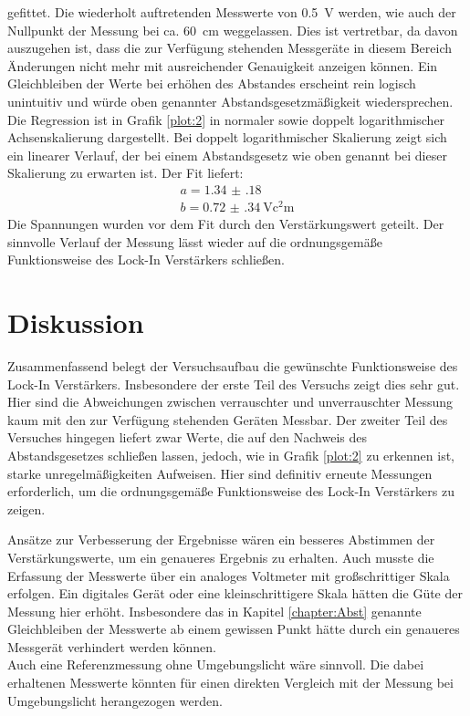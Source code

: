 gefittet. Die wiederholt auftretenden Messwerte von \SI{0.5}{\volt} werden, wie auch der Nullpunkt der Messung bei ca. \SI{60}{\centi\metre}
weggelassen. Dies ist vertretbar, da davon auszugehen ist, dass die zur Verfügung stehenden Messgeräte in diesem Bereich Änderungen nicht
mehr mit ausreichender Genauigkeit anzeigen können. Ein Gleichbleiben der Werte bei erhöhen des Abstandes
erscheint rein logisch unintuitiv und würde oben genannter Abstandsgesetzmäßigkeit wiedersprechen. Die Regression ist
in Grafik \ref{plot:2} in normaler sowie doppelt logarithmischer Achsenskalierung dargestellt.
Bei doppelt logarithmischer Skalierung zeigt sich ein linearer Verlauf, der bei einem Abstandsgesetz wie oben genannt
bei dieser Skalierung zu erwarten ist. Der Fit liefert:
\begin{equation*}
  \begin{split}
    a = \num{1.34(18)}\\
    b = \SI{0.72(34)}{\volt\square\centi\metre}
  \end{split}
\end{equation*}
Die Spannungen wurden vor dem Fit durch den Verstärkungswert geteilt. Der sinnvolle Verlauf der Messung
lässt wieder auf die ordnungsgemäße Funktionsweise des Lock-In Verstärkers schließen.
\section{Diskussion}
Zusammenfassend belegt der Versuchsaufbau die gewünschte Funktionsweise des Lock-In Verstärkers. Insbesondere der erste Teil
des Versuchs zeigt dies sehr gut. Hier sind die Abweichungen zwischen verrauschter und unverrauschter Messung kaum mit
den zur Verfügung stehenden Geräten Messbar. Der zweiter Teil des Versuches hingegen liefert zwar
Werte, die auf den Nachweis des Abstandsgesetzes schließen lassen, jedoch, wie in Grafik \ref{plot:2} zu erkennen ist,
starke unregelmäßigkeiten Aufweisen. Hier sind definitiv erneute Messungen erforderlich, um
die ordnungsgemäße Funktionsweise des Lock-In Verstärkers zu zeigen.

Ansätze zur Verbesserung der Ergebnisse wären ein besseres Abstimmen der Verstärkungswerte, um ein
genaueres Ergebnis zu erhalten. Auch musste die Erfassung der Messwerte über ein analoges
Voltmeter mit großschrittiger Skala erfolgen. Ein digitales Gerät oder eine kleinschrittigere
Skala hätten die Güte der Messung hier erhöht. Insbesondere das in Kapitel \ref{chapter:Abst}
genannte Gleichbleiben der Messwerte ab einem gewissen Punkt hätte durch ein genaueres
Messgerät verhindert werden können.\\
Auch eine Referenzmessung ohne Umgebungslicht wäre sinnvoll. Die dabei erhaltenen
Messwerte könnten für einen direkten Vergleich mit der Messung bei Umgebungslicht herangezogen werden.

\newpage
\nocite{*}
\printbibliography
